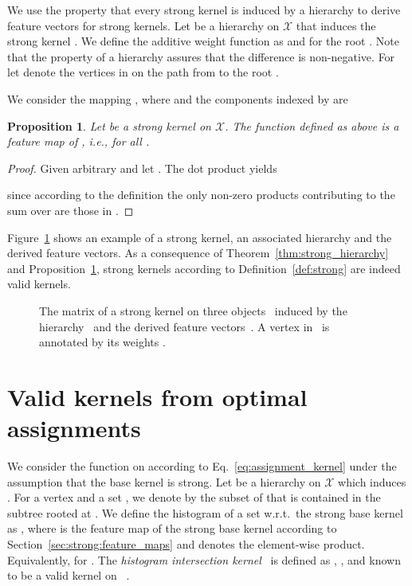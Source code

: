 \documentclass{article}
\newtheorem{proposition}{Proposition}
\newcommand{\X}{\ensuremath{\mathcal{X}}\xspace}
\begin{document}
We use the property that every strong kernel is induced by a hierarchy to derive
feature vectors for strong kernels.
Let  be a hierarchy on \X that induces the strong kernel . We define 
the additive weight function  as
 and  for the root . 
Note that the property of a hierarchy assures that the difference is non-negative.
For  let  denote the vertices in  on
the path from  to the root .

We consider the mapping , where  and
the components indexed by  are

\begin{proposition}\label{prop:strong:feature_map}
 Let  be a strong kernel on \X. The function  defined as 
 above is a feature map of , i.e.,  for all 
 .
\end{proposition}
\begin{proof}
 Given arbitrary  and let .
 The dot product yields 
 
 since according to the definition the only non-zero products contributing to the 
 sum over  are those in . 
\end{proof}

Figure~\ref{fig:example} shows an example of a strong kernel, an associated 
hierarchy and the derived feature vectors.
As a consequence of Theorem~\ref{thm:strong_hierarchy} and 
Proposition~\ref{prop:strong:feature_map}, strong kernels according to Definition~\ref{def:strong} are indeed valid kernels.

\begin{figure}
  \centering
  \null\hfill
  \hfill
  \hfill
  \hfill\null
  \caption{The matrix of a strong kernel on three 
    objects~ induced by the
    hierarchy~ and the derived feature 
    vectors~. A vertex  
    in~ is annotated by its weights 
    .
  }
  \label{fig:example}
\end{figure}


\section{Valid kernels from optimal assignments}
We consider the function  on  according to Eq.~\eqref{eq:assignment_kernel} 
under the assumption that the base kernel  is strong.
Let  be a hierarchy on \X which induces .
For a vertex  and a set , we denote by  the 
subset of  that is contained in the subtree rooted at .
We define the histogram  of a set  w.r.t.\ the strong base 
kernel  as , where  is 
the feature map of the strong base kernel according to 
Section~\ref{sec:strong:feature_maps} and  denotes the element-wise 
product. Equivalently,  for .
The \emph{histogram intersection kernel}~\cite{Swain1991} is defined as
,
, and known to be a valid kernel on ~\cite{Barla2003,Boughorbel2005}.
\end{document}
